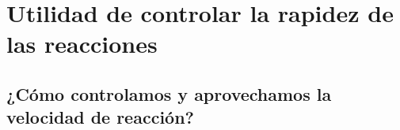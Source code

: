 \newpage \thispagestyle{plain}
\section{Utilidad de controlar la rapidez de las reacciones}
\subsection{¿Cómo controlamos y aprovechamos la velocidad de reacción?}
